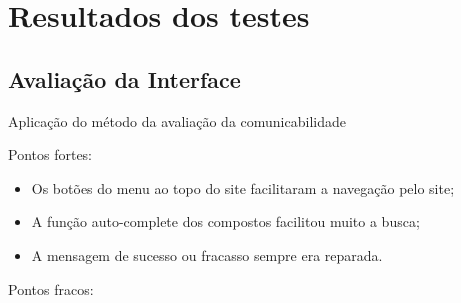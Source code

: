 \chapter{Resultados dos testes}


\section{Avaliação da Interface}

Aplicação do método da avaliação da comunicabilidade

Pontos fortes: \\

\begin{itemize}
  \item Os botões do menu ao topo do site facilitaram a navegação pelo site;
  \item A função auto-complete dos compostos facilitou muito a busca;
  \item A mensagem de sucesso ou fracasso sempre era reparada.
\end{itemize}

 
Pontos fracos:\\

